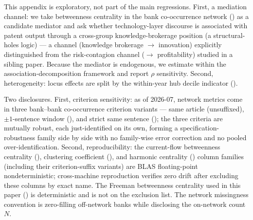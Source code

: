 This appendix is exploratory, not part of the main regressions. First, a mediation
channel: we take betweenness centrality in the bank co-occurrence network
() as a candidate mediator and ask whether technology-layer
discourse is associated with patent output through a cross-group knowledge-brokerage
position (a structural-holes logic) — a channel (knowledge brokerage $\to$ innovation)
explicitly distinguished from the risk-contagion channel ($\to$ profitability) studied
in a sibling paper. Because the mediator is endogenous, we estimate within the
association-decomposition framework and report \textcite{imai2010general} $\rho$
sensitivity. Second, heterogeneity: locus effects are split by the within-year hub
decile indicator (). 

Two disclosures. First, criterion sensitivity: as of 2026-07, network metrics come in
three bank--bank co-occurrence criterion variants — same article (unsuffixed),
$\pm 1$-sentence window (), and strict same sentence (); the
three criteria are mutually robust, each just-identified on its own, forming a
specification-robustness family side by side with no family-wise error correction and
no pooled over-identification. Second, reproducibility: the current-flow betweenness
centrality (), clustering coefficient
(), and harmonic centrality () column
families (including their criterion-suffix variants) are BLAS floating-point
nondeterministic; cross-machine reproduction verifies zero drift after excluding these
columns by exact name. The Freeman betweenness centrality used in this paper
() is deterministic and is not on the exclusion list. The
network missingness convention is zero-filling off-network banks while disclosing the
on-network count $N$.

\printbibliography


